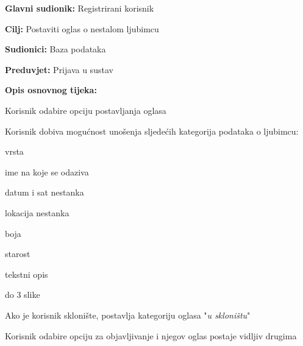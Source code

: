 					\noindent {}
					\begin{packed_item}
	
						\item \textbf{Glavni sudionik:} Registrirani korisnik
						\item  \textbf{Cilj:} Postaviti oglas o nestalom ljubimcu
						\item  \textbf{Sudionici:} Baza podataka
						\item  \textbf{Preduvjet:} Prijava u sustav
						\item  \textbf{Opis osnovnog tijeka:}
						
						\item[] \begin{packed_enum}
	
							\item Korisnik odabire opciju postavljanja oglasa
							\item Korisnik dobiva mogućnost unošenja sljedećih kategorija podataka o ljubimcu:
								
								\item[] \begin {packed_enum}
									\item vrsta
									\item ime na koje se odaziva
									\item datum i sat nestanka
									\item lokacija nestanka
									\item boja
									\item starost
									\item tekstni opis
									\item do 3 slike
								\end{packed_enum}
							
							\item Ako je korisnik sklonište, postavlja kategoriju oglasa "\textit{u skloništu}"
							\item Korisnik odabire opciju za objavljivanje i njegov oglas postaje vidljiv drugima
						\end{packed_enum}
					\end{packed_item}
					\pagebreak
					
